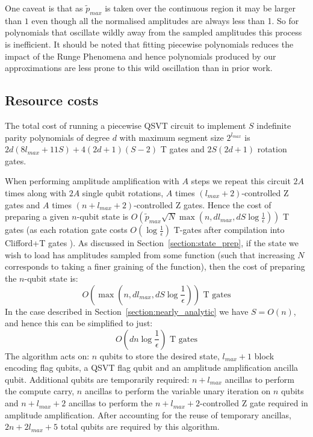 \documentclass[aps,prx,twocolumn,floatfix,10pt,amssymb,amsfont,amsmath,superscriptaddress,float,nofootinbib,longbibliography,nobalancelastpage]{revtex4-2}
\theoremstyle{empty}
\begin{document}
One caveat is that as $\tilde{p}_{max}$ is taken over the continuous region it may be larger than $1$ even though all the normalised amplitudes are always less than 1. So for polynomials that oscillate wildly away from the sampled amplitudes this process is inefficient. It should be noted that fitting piecewise polynomials reduces the impact of the Runge Phenomena and hence polynomials produced by our approximations are less prone to this wild oscillation than in prior work. 

\subsection{Resource costs}
The total cost of running a piecewise QSVT circuit to implement $S$ indefinite parity polynomials of degree $d$ with maximum segment size $2^{l_{max}}$ is $2d(8l_{max} + 11S) +4(2d+1)(S-2)$ T gates and $2S(2d+1)$ rotation gates. 

When performing amplitude amplification with $A$ steps we repeat this circuit $2A$ times along with $2A$ single qubit rotations, $A$ times $(l_{max}+2)$-controlled Z gates and $A$ times $(n+l_{max}+2)$-controlled Z gates. Hence the cost of preparing a given $n$-qubit state is $O\left(\tilde{p}_{max}\sqrt{N}\max(n,dl_{max},dS\log \frac{1}{\epsilon})\right)$ T gates (as each rotation gate costs $O(\log\frac{1}{\epsilon})$ T-gates after compilation into Clifford+T gates \cite{Bocharov_2015}). As discussed in Section~\ref{section:state_prep}, if the state we wish to load has amplitudes sampled from some function (such that increasing $N$ corresponds to taking a finer graining of the function), then the cost of preparing the $n$-qubit state is:
\begin{equation}
    O\left(\max\left(n,dl_{max},dS\log \frac{1}{\epsilon}\right)\right) \text{ T gates}
\end{equation}
In the case described in Section~\ref{section:nearly_analytic} we have $S = O(n)$, and hence this can be simplified to just:
\begin{equation}
    O\left(dn \log \frac{1}{\epsilon}\right)  \text{ T gates}
\end{equation}
The algorithm acts on: $n$ qubits to store the desired state, $l_{max} + 1$ block encoding flag qubits, a QSVT flag qubit and an amplitude amplification ancilla qubit. Additional qubits are temporarily required: $n + l_{max}$ ancillas to perform the compute carry, $n$ ancillas to perform the variable unary iteration on $n$ qubits and $n+l_{max}+2$ ancillas to perform the $n+l_{max} +2$-controlled Z gate required in amplitude amplification. After accounting for the reuse of temporary ancillas, $2n + 2l_{max} + 5$ total qubits are required by this algorithm.
\end{document}
